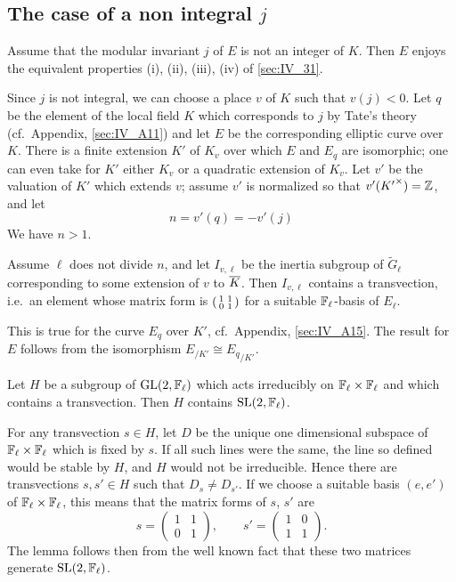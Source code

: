 \subsection{The case of a non integral $j$}
\label{sec:IV_32}
\dpage
\begin{thm}
	Assume that the modular invariant $j$ of $E$ is not an integer of $K$.
	Then $E$ enjoys the equivalent properties (i), (ii), (iii), (iv) of
	\ref{sec:IV_31}.
\end{thm}
Since $j$ is not integral, we can choose a place $v$ of $K$ such
that $v(j) < 0$. Let $q$ be the element of the local field $K$ which
corresponds to $j$ by Tate's theory (cf.\ Appendix, \ref{sec:IV_A11}) and let $E$
be the corresponding elliptic curve over $K$. There is a finite
extension $K'$ of $K_v$ over which $E$ and $E_q$ are isomorphic; one
can even take for $K'$ either $K_v$ or a quadratic extension of $K_v$.
Let $v'$ be the valuation of $K'$ which extends $v$; assume $v'$ is
normalized so that $v'({K'}^\times) = \mathbb{Z}$, and let
\[
	n = v'(q) = - v'(j)
\]
We have $n > 1$.

\begin{lem}\label{lem:IV_32_1}
	Assume $\ell$ does not divide $n$, and let $I_{v, \ell}$ be the inertia
	subgroup of $\widetilde{G}_\ell$ corresponding to some extension of $v$
	to $\overline{K}$.  Then $I_{v, \ell}$ contains a transvection, i.e.\ an
	element whose matrix form is $
	\begin{psmallmatrix}
		1 & 1 \\
		0 & 1
	\end{psmallmatrix}
	$ for a suitable $\mathbb{F}_\ell$-basis of $E_\ell$.
\end{lem}
This is true for the curve $E_q$ over $K'$, cf.\ Appendix, \ref{sec:IV_A15}.
The result for $E$ follows from the isomorphism $E_{/K'} \cong {E_q}_{/K'}$.

\begin{lem}\label{lem:IV_32_2}
	Let $H$ be a subgroup of $\operatorname{GL}(2, \mathbb{F}_\ell)$ which acts irreducibly on
	$\mathbb{F}_\ell\times\mathbb{F}_\ell$ and which contains a transvection. Then $H$
	contains $\operatorname{SL}(2, \mathbb{F}_\ell)$.
\end{lem}

\dpage

For any transvection $s \in H$, let $D$ be the unique one dimensional subspace
of $\mathbb{F}_\ell\times\mathbb{F}_\ell$ which is fixed by $s$. If all such lines were the
same, the line so defined would be stable by $H$, and $H$ would not be
irreducible. Hence there are transvections $s, s' \in H$ such that $D_s \ne
D_{s'}$. If we choose a suitable basis $(e,e')$ of $\mathbb{F}_\ell\times\mathbb{F}_\ell$, this
means that the matrix forms of $s$, $s'$ are
\[
	s =
	\begin{pmatrix}
		1 & 1 \\
		0 & 1
	\end{pmatrix}, \qquad s' = 
	\begin{pmatrix}
		1 & 0 \\
		1 & 1
	\end{pmatrix}.
\]
The lemma follows then from the well known fact that these two matrices
generate $\operatorname{SL}(2, \mathbb{F}_\ell)$.

